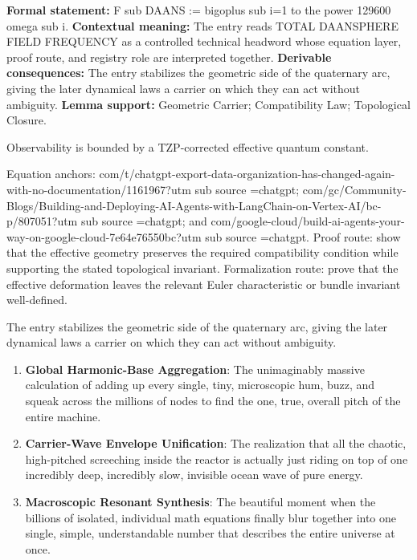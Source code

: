 \begingroup\footnotesize\setlength{\emergencystretch}{3em}\sloppy
\textbf{Formal statement:} F sub DAANS := bigoplus sub i=1 to the power 129600 omega sub i. \textbf{Contextual meaning:} The entry reads TOTAL DAANSPHERE FIELD FREQUENCY as a controlled technical headword whose equation layer, proof route, and registry role are interpreted together. \textbf{Derivable consequences:} The entry stabilizes the geometric side of the quaternary arc, giving the later dynamical laws a carrier on which they can act without ambiguity. \textbf{Lemma support:} Geometric Carrier; Compatibility Law; Topological Closure.\par
\endgroup

Observability is bounded by a TZP-corrected effective quantum constant.

Equation anchors: com/t/chatgpt-export-data-organization-has-changed-again-with-no-documentation/1161967?utm sub source =chatgpt; com/gc/Community-Blogs/Building-and-Deploying-AI-Agents-with-LangChain-on-Vertex-AI/bc-p/807051?utm sub source =chatgpt; and com/google-cloud/build-ai-agents-your-way-on-google-cloud-7e64e76550bc?utm sub source =chatgpt. Proof route: show that the effective geometry preserves the required compatibility condition while supporting the stated topological invariant. Formalization route: prove that the effective deformation leaves the relevant Euler characteristic or bundle invariant well-defined.

The entry stabilizes the geometric side of the quaternary arc, giving the later dynamical laws a carrier on which they can act without ambiguity.
\endgroup

\begin{enumerate}[leftmargin=1.6em,itemsep=6pt,topsep=4pt]
\item \textbf{Global Harmonic-Base Aggregation}: The unimaginably massive calculation of adding up every single, tiny, microscopic hum, buzz, and squeak across the millions of nodes to find the one, true, overall pitch of the entire machine.
\item \textbf{Carrier-Wave Envelope Unification}: The realization that all the chaotic, high-pitched screeching inside the reactor is actually just riding on top of one incredibly deep, incredibly slow, invisible ocean wave of pure energy.
\item \textbf{Macroscopic Resonant Synthesis}: The beautiful moment when the billions of isolated, individual math equations finally blur together into one single, simple, understandable number that describes the entire universe at once.
\end{enumerate}

